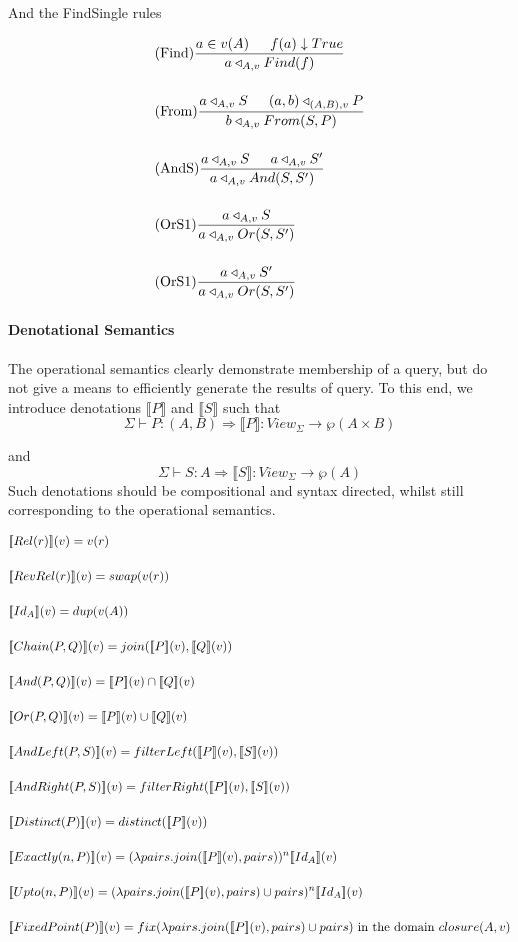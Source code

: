 \documentclass[12pt,a4paper,twoside,openright]{report}
\newcommand{\db}[1]{{\bf [\![}#1{\bf ]\!]}}
\newcommand{\deno}[1]{\db{#1}(v)}
\newcommand{\clos}[0]{closure(A, v)}
\newcommand{\opRule}[3]{#1 \triangleleft_{#2, v} #3}
\let\oldparagraph\paragraph
\renewcommand{\paragraph}[1]{\oldparagraph{#1}\mbox{}}
\begin{document}
And the FindSingle rules

\begin{align}
&\displaystyle\mbox{(Find)}\frac{a \in v(A) \indent f(a)\downarrow True}{\opRule{a}{A}{Find(f)}} \\[3ex]
&\displaystyle\mbox{(From)}\frac{\opRule{a}{A}{S} \indent \opRule{(a,b)}{(A, B)}{P}}{\opRule{b}{A}{From(S, P)}} \\[3ex]
&\displaystyle\mbox{(AndS)}\frac{\opRule{a}{A}{S} \indent \opRule{a}{A}{S'}}{\opRule{a}{A}{And(S, S')}} \\[3ex]
&\displaystyle\mbox{(OrS1)}\frac{\opRule{a}{A}{S}}{\opRule{a}{A}{Or(S, S')}} \\[3ex]
&\displaystyle\mbox{(OrS1)}\frac{\opRule{a}{A}{S'}}{\opRule{a}{A}{Or(S, S')}}
\end{align}
\paragraph{Denotational Semantics}
The operational semantics clearly demonstrate membership of a query, but do not give a means to efficiently generate the results of query. To this end, we introduce denotations $\llbracket P \rrbracket$ and $\llbracket S \rrbracket$ such that \[\Sigma \vdash P \colon (A, B) \Rightarrow\llbracket P \rrbracket \colon View_{\Sigma} \rightarrow \wp(A \times B)\]

and \[\Sigma \vdash S \colon A \Rightarrow\llbracket S \rrbracket \colon View_{\Sigma} \rightarrow \wp(A)\] Such denotations should be compositional and syntax directed, whilst still corresponding to the operational semantics.

\begin{align}
& \deno{Rel(r)} = v(r) \\[3ex]
& \deno{RevRel(r)} = swap(v(r)) \\[3ex]
& \deno{Id_A} = dup(v(A)) \\[3ex]
& \deno{Chain(P, Q)} = join(\deno{P}, \deno{Q}) \\[3ex]
& \deno{And(P, Q)} = \deno{P} \cap \deno{Q} \\[3ex]
& \deno{Or(P, Q)} = \deno{P} \cup \deno{Q} \\[3ex]
& \deno{AndLeft(P, S)} = filterLeft(\deno{P}, \deno{S}) \\[3ex]
& \deno{AndRight(P, S)} = filterRight(\deno{P}, \deno{S}) \\[3ex]
& \deno{Distinct(P)} = distinct(\deno{P}) \\[3ex]
& \deno{Exactly(n, P)} = (\lambda pairs. join(\deno{P}, pairs))^n \deno{Id_A} \\[3ex]
& \deno{Upto(n, P)} = (\lambda pairs. join(\deno{P}, pairs) \cup pairs)^n \deno{Id_A} \\[3ex]
& \deno{FixedPoint(P)} = fix (\lambda pairs. join(\deno{P}, pairs) \cup pairs)  \mbox{ in the domain $\clos$}
\end{align}
\end{document}
